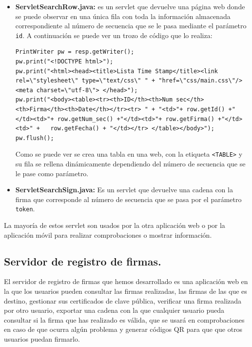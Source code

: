 \begin{itemize}
\item \textbf{ServletSearchRow.java:} es un servlet que devuelve una página web donde se puede observar en una única fila con toda la información almacenada correspondiente al número de secuencia que se le pasa mediante el parámetro \lstinline{id}. A continuación se puede ver un trozo de código que lo realiza:

\begin{lstlisting}[style=Java]
PrintWriter pw = resp.getWriter();
pw.print("<!DOCTYPE html>");
pw.print("<html><head><title>Lista Time Stamp</title><link rel=\"stylesheet\" type=\"text/css\" " + "href=\"css/main.css\"/> <meta charset=\"utf-8\"> </head>");
pw.print("<body><table><tr><th>ID</th><th>Num sec</th><th>Firma</th><th>Date</th></tr><tr> " + "<td>"+ row.getId() +"</td><td>"+ row.getNum_sec() +"</td><td>"+ row.getFirma() +"</td><td>" +	row.getFecha() + "</td></tr> </table></body>");
pw.flush();
\end{lstlisting}

Como se puede ver se crea una tabla en una web, con la etiqueta \lstinline{<TABLE>} y su fila se rellena dinámicamente dependiendo del número de secuencia que se le pase como parámetro.

\item \textbf{ServletSearchSign.java:} Es un servlet que devuelve una cadena con la firma que corresponde al número de secuencia que se pasa por el parámetro \lstinline{token}.

\end{itemize}

La mayoría de estos servlet son usados por la otra aplicación web o por la aplicación móvil para realizar comprobaciones o mostrar información.


\subsection{Servidor de registro de firmas.}

El servidor de registro de firmas que hemos desarrollado es una aplicación web en la que los usuarios pueden consultar las firmas realizadas, las firmas de las que es destino, gestionar sus certificados de clave pública, verificar una firma realizada por otro usuario, exportar una cadena con la que cualquier usuario pueda consultar si la firma que has realizado es válida, que se usará en comprobaciones en caso de que ocurra algún problema y generar códigos QR para que que otros usuarios puedan firmarlo.

